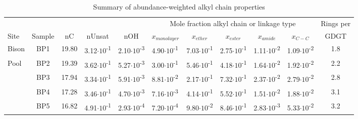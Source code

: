 \begin{landscape}
\singlespace

\begin{table}
\centering
\normalsize
\begin{adjustbox}{width=600pt,keepaspectratio}
\begin{threeparttable}
  \caption{Summary of abundance-weighted alkyl chain properties}
  

\begin{tabular}{lccccllcccc}
\toprule
      &       &       &       &       & \multicolumn{5}{c}{Mole fraction alkyl chain or linkage type} & Rings per \\
\cmidrule{6-10}Site  & Sample & nC    & nUnsat & nOH   & \multicolumn{1}{c}{$x_{monolayer}$} & \multicolumn{1}{c}{$x_{ether}$} & $x_{ester}$ & $x_{amide}$ & $x_{C-C}$ & GDGT \\
\midrule
Bison & BP1   & 19.80 & 3.12$\cdot 10$\textsuperscript{-1} & 2.10$\cdot 10$\textsuperscript{-3} & 4.90$\cdot 10$\textsuperscript{-1} & 7.03$\cdot 10$\textsuperscript{-1} & 2.75$\cdot 10$\textsuperscript{-1} & 1.11$\cdot 10$\textsuperscript{-2} & 1.09$\cdot 10$\textsuperscript{-2} & 1.8 \\
Pool  & BP2   & 19.39 & 3.62$\cdot 10$\textsuperscript{-1} & 5.27$\cdot 10$\textsuperscript{-3} & 3.00$\cdot 10$\textsuperscript{-1} & 5.46$\cdot 10$\textsuperscript{-1} & 4.18$\cdot 10$\textsuperscript{-1} & 1.64$\cdot 10$\textsuperscript{-2} & 1.92$\cdot 10$\textsuperscript{-2} & 2.2 \\
      & BP3   & 17.94 & 3.34$\cdot 10$\textsuperscript{-1} & 5.91$\cdot 10$\textsuperscript{-3} & 8.81$\cdot 10$\textsuperscript{-2} & 2.17$\cdot 10$\textsuperscript{-1} & 7.32$\cdot 10$\textsuperscript{-1} & 2.37$\cdot 10$\textsuperscript{-2} & 2.79$\cdot 10$\textsuperscript{-2} & 2.8 \\
      & BP4   & 17.28 & 3.46$\cdot 10$\textsuperscript{-1} & 4.70$\cdot 10$\textsuperscript{-3} & 7.16$\cdot 10$\textsuperscript{-3} & 4.14$\cdot 10$\textsuperscript{-1} & 5.52$\cdot 10$\textsuperscript{-1} & 1.51$\cdot 10$\textsuperscript{-2} & 1.88$\cdot 10$\textsuperscript{-2} & 3.1 \\
      & BP5   & 16.82 & 4.91$\cdot 10$\textsuperscript{-1} & 2.93$\cdot 10$\textsuperscript{-4} & 7.20$\cdot 10$\textsuperscript{-4} & 9.80$\cdot 10$\textsuperscript{-2} & 8.46$\cdot 10$\textsuperscript{-1} & 2.83$\cdot 10$\textsuperscript{-3} & 5.33$\cdot 10$\textsuperscript{-2} & 3.2 \\

\end{tabular}
\end{threeparttable}
\end{adjustbox}
\end{table}
\end{landscape}

